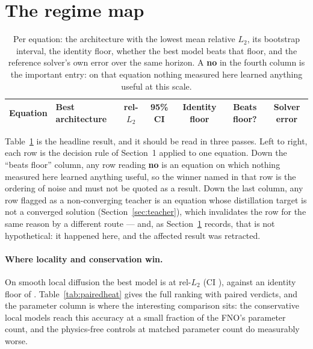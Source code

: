 \documentclass{article}
\begin{document}
\section{The regime map}
\label{sec:regime}

\begin{table}[t]
\centering
\caption{Per equation: the architecture with the lowest mean relative $L_2$, its
bootstrap interval, the identity floor, whether the best model beats that floor, and the
reference solver's own error over the same horizon. A \textbf{no} in the fourth column is
the important entry: on that equation nothing measured here learned anything useful at
this scale.}
\label{tab:regime}
\small
\begin{tabular}{llccccc}
\toprule
Equation & Best architecture & rel-$L_2$ & 95\% CI & Identity floor & Beats floor?
  & Solver error \\
\midrule

\bottomrule
\end{tabular}
\end{table}

Table~\ref{tab:regime} is the headline result, and it should be read in three passes. Left
to right, each row is the decision rule of Section~1 applied to one equation. Down the
``beats floor'' column, any row reading \textbf{no} is an equation on which nothing measured
here learned anything useful, so the winner named in that row is the ordering of noise and
must not be quoted as a result. Down the last column, any row flagged as a non-converging
teacher is an equation whose distillation target is not a converged solution
(Section~\ref{sec:teacher}), which invalidates the row for the same reason by a different
route --- and, as Section~\ref{sec:regime} records, that is not hypothetical: it happened
here, and the affected result was retracted.

\paragraph{Where locality and conservation win.} On smooth local diffusion the best model
is \bestHeat{} at rel-$L_2$ \bestHeatErr{} (CI \bestHeatCI{}), against an identity floor of
\floorHeat{}. Table~\ref{tab:pairedheat} gives the full ranking with paired verdicts, and
the parameter column is where the interesting comparison sits: the conservative local
models reach this accuracy at a small fraction of the FNO's parameter count, and the
physics-free controls at matched parameter count do measurably worse.
\end{document}
